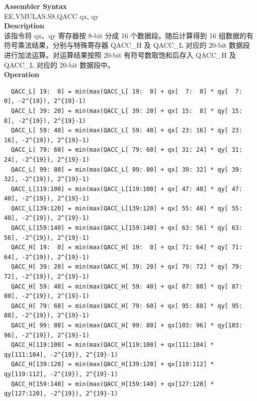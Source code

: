 \textbf{Assembler Syntax} \\
EE.VMULAS.S8.QACC qx, qy \\
\textbf{Description} \\
该指令将 qx、qy 寄存器按 8-bit 分成 16 个数据段。随后计算得到 16 组数据的有符号乘法结果，分别与特殊寄存器 QACC\_H 及 QACC\_L 对应的 20-bit 数据段进行加法运算。对运算结果按照 20-bit 有符号数取饱和后存入 QACC\_H 及 QACC\_L 对应的 20-bit 数据段中。\\
\textbf{Operation}
\begin{lstlisting}
  QACC_L[ 19:  0] = min(max(QACC_L[ 19:  0] + qx[  7:  0] * qy[  7:  0], -2^{19}), 2^{19}-1)
  QACC_L[ 39: 20] = min(max(QACC_L[ 39: 20] + qx[ 15:  8] * qy[ 15:  8], -2^{19}), 2^{19}-1)
  QACC_L[ 59: 40] = min(max(QACC_L[ 59: 40] + qx[ 23: 16] * qy[ 23: 16], -2^{19}), 2^{19}-1)
  QACC_L[ 79: 60] = min(max(QACC_L[ 79: 60] + qx[ 31: 24] * qy[ 31: 24], -2^{19}), 2^{19}-1)
  QACC_L[ 99: 80] = min(max(QACC_L[ 99: 80] + qx[ 39: 32] * qy[ 39: 32], -2^{19}), 2^{19}-1)
  QACC_L[119:100] = min(max(QACC_L[119:100] + qx[ 47: 40] * qy[ 47: 40], -2^{19}), 2^{19}-1)
  QACC_L[139:120] = min(max(QACC_L[139:120] + qx[ 55: 48] * qy[ 55: 48], -2^{19}), 2^{19}-1)
  QACC_L[159:140] = min(max(QACC_L[159:140] + qx[ 63: 56] * qy[ 63: 56], -2^{19}), 2^{19}-1)
  QACC_H[ 19:  0] = min(max(QACC_H[ 19:  0] + qx[ 71: 64] * qy[ 71: 64], -2^{19}), 2^{19}-1)
  QACC_H[ 39: 20] = min(max(QACC_H[ 39: 20] + qx[ 79: 72] * qy[ 79: 72], -2^{19}), 2^{19}-1)
  QACC_H[ 59: 40] = min(max(QACC_H[ 59: 40] + qx[ 87: 80] * qy[ 87: 80], -2^{19}), 2^{19}-1)
  QACC_H[ 79: 60] = min(max(QACC_H[ 79: 60] + qx[ 95: 88] * qy[ 95: 88], -2^{19}), 2^{19}-1)
  QACC_H[ 99: 80] = min(max(QACC_H[ 99: 80] + qx[103: 96] * qy[103: 96], -2^{19}), 2^{19}-1)
  QACC_H[119:100] = min(max(QACC_H[119:100] + qx[111:104] * qy[111:104], -2^{19}), 2^{19}-1)
  QACC_H[139:120] = min(max(QACC_H[139:120] + qx[119:112] * qy[119:112], -2^{19}), 2^{19}-1)
  QACC_H[159:140] = min(max(QACC_H[159:140] + qx[127:120] * qy[127:120], -2^{19}), 2^{19}-1)
\end{lstlisting}

\clearpage
